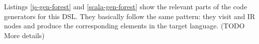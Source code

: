 \documentclass[preprint]{sigplanconf}
\newcommand{\eg}{\emph{e.g.}}
\begin{document}
Listings \ref{js-gen-forest} and \ref{scala-gen-forest} show the relevant parts of the code generators for this DSL.
They basically follow the same pattern: they visit  and  IR nodes and produce the corresponding
elements in the target language. (TODO More details)

% 
% 
% 
% 
% 
% 
% 
\end{document}
